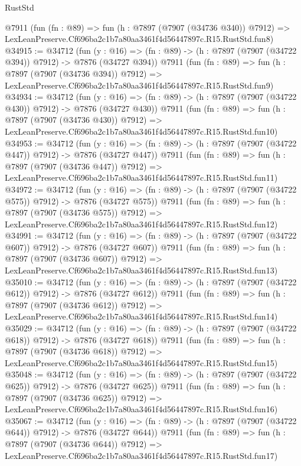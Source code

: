 \begin{lexlean}{RustStd}
\begin{coremodule}
    @7911
    (fun (fn : @89) =>
    fun (h : @7897 (@7907 (@34736 @340)) @7912) =>
    LexLeanPreserve.Cf696ba2c1b7a80aa3461f4d56447897c.R15.RustStd.fun8)
@34915 := @34712
    (fun (y : @16) => (fn : @89) -> (h : @7897 (@7907 (@34722 @394)) @7912) -> @7876 (@34727 @394))
    @7911
    (fun (fn : @89) =>
    fun (h : @7897 (@7907 (@34736 @394)) @7912) =>
    LexLeanPreserve.Cf696ba2c1b7a80aa3461f4d56447897c.R15.RustStd.fun9)
@34934 := @34712
    (fun (y : @16) => (fn : @89) -> (h : @7897 (@7907 (@34722 @430)) @7912) -> @7876 (@34727 @430))
    @7911
    (fun (fn : @89) =>
    fun (h : @7897 (@7907 (@34736 @430)) @7912) =>
    LexLeanPreserve.Cf696ba2c1b7a80aa3461f4d56447897c.R15.RustStd.fun10)
@34953 := @34712
    (fun (y : @16) => (fn : @89) -> (h : @7897 (@7907 (@34722 @447)) @7912) -> @7876 (@34727 @447))
    @7911
    (fun (fn : @89) =>
    fun (h : @7897 (@7907 (@34736 @447)) @7912) =>
    LexLeanPreserve.Cf696ba2c1b7a80aa3461f4d56447897c.R15.RustStd.fun11)
@34972 := @34712
    (fun (y : @16) => (fn : @89) -> (h : @7897 (@7907 (@34722 @575)) @7912) -> @7876 (@34727 @575))
    @7911
    (fun (fn : @89) =>
    fun (h : @7897 (@7907 (@34736 @575)) @7912) =>
    LexLeanPreserve.Cf696ba2c1b7a80aa3461f4d56447897c.R15.RustStd.fun12)
@34991 := @34712
    (fun (y : @16) => (fn : @89) -> (h : @7897 (@7907 (@34722 @607)) @7912) -> @7876 (@34727 @607))
    @7911
    (fun (fn : @89) =>
    fun (h : @7897 (@7907 (@34736 @607)) @7912) =>
    LexLeanPreserve.Cf696ba2c1b7a80aa3461f4d56447897c.R15.RustStd.fun13)
@35010 := @34712
    (fun (y : @16) => (fn : @89) -> (h : @7897 (@7907 (@34722 @612)) @7912) -> @7876 (@34727 @612))
    @7911
    (fun (fn : @89) =>
    fun (h : @7897 (@7907 (@34736 @612)) @7912) =>
    LexLeanPreserve.Cf696ba2c1b7a80aa3461f4d56447897c.R15.RustStd.fun14)
@35029 := @34712
    (fun (y : @16) => (fn : @89) -> (h : @7897 (@7907 (@34722 @618)) @7912) -> @7876 (@34727 @618))
    @7911
    (fun (fn : @89) =>
    fun (h : @7897 (@7907 (@34736 @618)) @7912) =>
    LexLeanPreserve.Cf696ba2c1b7a80aa3461f4d56447897c.R15.RustStd.fun15)
@35048 := @34712
    (fun (y : @16) => (fn : @89) -> (h : @7897 (@7907 (@34722 @625)) @7912) -> @7876 (@34727 @625))
    @7911
    (fun (fn : @89) =>
    fun (h : @7897 (@7907 (@34736 @625)) @7912) =>
    LexLeanPreserve.Cf696ba2c1b7a80aa3461f4d56447897c.R15.RustStd.fun16)
@35067 := @34712
    (fun (y : @16) => (fn : @89) -> (h : @7897 (@7907 (@34722 @644)) @7912) -> @7876 (@34727 @644))
    @7911
    (fun (fn : @89) =>
    fun (h : @7897 (@7907 (@34736 @644)) @7912) =>
    LexLeanPreserve.Cf696ba2c1b7a80aa3461f4d56447897c.R15.RustStd.fun17)

\end{coremodule}
\end{lexlean}
